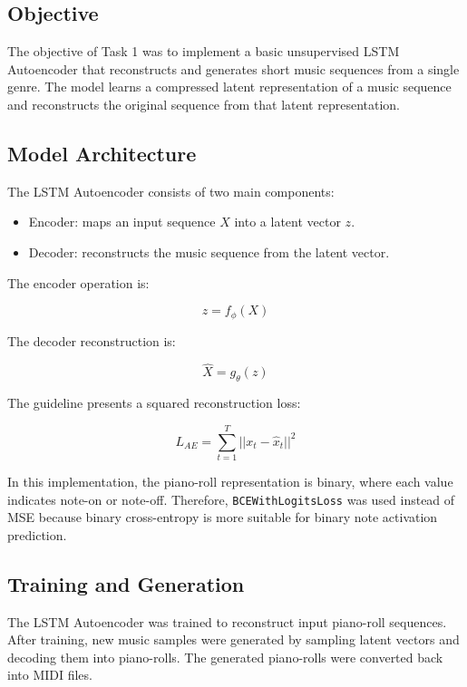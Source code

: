 \documentclass[conference]{IEEEtran}
\begin{document}
\subsection{Objective}

The objective of Task 1 was to implement a basic unsupervised LSTM Autoencoder that reconstructs and generates short music sequences from a single genre. The model learns a compressed latent representation of a music sequence and reconstructs the original sequence from that latent representation.

\subsection{Model Architecture}

The LSTM Autoencoder consists of two main components:

\begin{itemize}
    \item Encoder: maps an input sequence $X$ into a latent vector $z$.
    \item Decoder: reconstructs the music sequence from the latent vector.
\end{itemize}

The encoder operation is:

\begin{equation}
z = f_{\phi}(X)
\end{equation}

The decoder reconstruction is:

\begin{equation}
\hat{X} = g_{\theta}(z)
\end{equation}

The guideline presents a squared reconstruction loss:

\begin{equation}
L_{AE} = \sum_{t=1}^{T} ||x_t - \hat{x}_t||^2
\end{equation}

In this implementation, the piano-roll representation is binary, where each value indicates note-on or note-off. Therefore, \texttt{BCEWithLogitsLoss} was used instead of MSE because binary cross-entropy is more suitable for binary note activation prediction.

\subsection{Training and Generation}

The LSTM Autoencoder was trained to reconstruct input piano-roll sequences. After training, new music samples were generated by sampling latent vectors and decoding them into piano-rolls. The generated piano-rolls were converted back into MIDI files.
\end{document}
